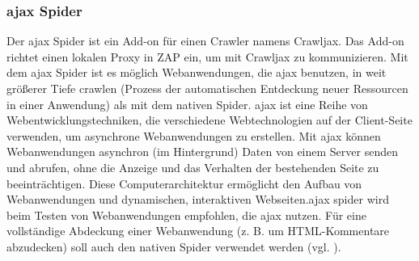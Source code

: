 \subsubsection{\acs{ajax} Spider}

Der \acs{ajax} Spider ist ein Add-on für einen Crawler namens Crawljax.
Das Add-on richtet einen lokalen Proxy in ZAP ein, um mit Crawljax
zu kommunizieren. Mit dem \acs{ajax} Spider ist es möglich Webanwendungen,
die  \acs{ajax} benutzen, in weit größerer Tiefe \gls{crawlen} (Prozess der
automatischen Entdeckung neuer Ressourcen in einer Anwendung) als mit
dem nativen Spider. \acs{ajax} ist eine Reihe von Webentwicklungstechniken, die
verschiedene Webtechnologien auf der Client-Seite verwenden, um
asynchrone Webanwendungen zu erstellen. Mit \acs{ajax} können Webanwendungen
asynchron (im Hintergrund) Daten von einem Server senden und abrufen,
ohne die Anzeige und das Verhalten der bestehenden Seite zu beeinträchtigen.
Diese Computerarchitektur ermöglicht den Aufbau von Webanwendungen und
dynamischen, interaktiven Webseiten.\acs{ajax} spider wird beim Testen von Webanwendungen
empfohlen, die \acs{ajax} nutzen. Für eine vollständige Abdeckung einer
Webanwendung (z. B. um HTML-Kommentare abzudecken) soll auch den
nativen Spider verwendet werden (vgl. \cite{ajax}).
